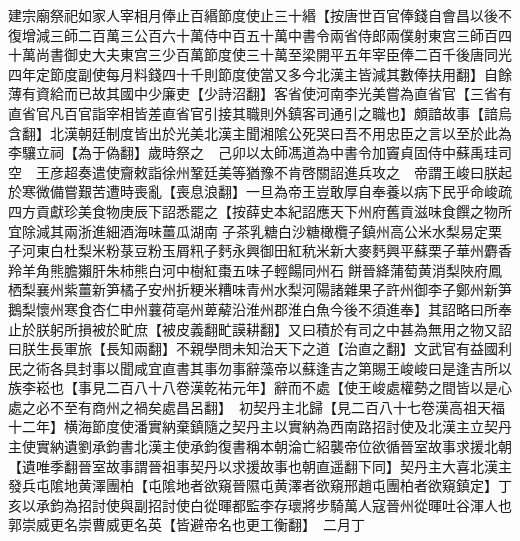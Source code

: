 建宗廟祭祀如家人宰相月俸止百緡節度使止三十緡【按唐世百官俸錢自會昌以後不復增減三師二百萬三公百六十萬侍中百五十萬中書令兩省侍郎兩僕射東宫三師百四十萬尚書御史大夫東宫三少百萬節度使三十萬至梁開平五年宰臣俸二百千後唐同光四年定節度副使每月料錢四十千則節度使當又多今北漢主皆減其數俸扶用翻】自餘薄有資給而已故其國中少廉吏【少詩沼翻】客省使河南李光美嘗為直省官【三省有直省官凡百官詣宰相皆差直省官引接其職則外鎮客司通引之職也】頗諳故事【諳烏含翻】北漢朝廷制度皆出於光美北漢主聞湘隂公死哭曰吾不用忠臣之言以至於此為李驤立祠【為于偽翻】歲時祭之　己卯以太師馮道為中書令加竇貞固侍中蘇禹珪司空　王彦超奏遣使齎敕詣徐州鞏廷美等猶豫不肯啓關詔進兵攻之　帝謂王峻曰朕起於寒微備嘗艱苦遭時喪亂【喪息浪翻】一旦為帝王豈敢厚自奉養以病下民乎命峻疏四方貢獻珍美食物庚辰下詔悉罷之【按薛史本紀詔應天下州府舊貢滋味食饌之物所宜除減其兩浙進細酒海味薑瓜湖南子茶乳糖白沙糖橄欖子鎮州高公米水梨易定栗子河東白杜梨米粉菉豆粉玉屑籸子麫永興御田紅秔米新大麥麫興平蘇栗子華州麝香羚羊角熊膽獺肝朱柿熊白河中樹紅棗五味子輕餳同州石餅晉絳蒲萄黄消梨陜府鳳栖梨襄州紫薑新笋橘子安州折粳米糟味青州水梨河陽諸雜果子許州御李子鄭州新笋鵝梨懷州寒食杏仁申州蘘荷亳州萆薢沿淮州郡淮白魚今後不須進奉】其詔略曰所奉止於朕躬所損被於甿庶【被皮義翻甿謨耕翻】又曰積於有司之中甚為無用之物又詔曰朕生長軍旅【長知兩翻】不親學問未知治天下之道【治直之翻】文武官有益國利民之術各具封事以聞咸宜直書其事勿事辭藻帝以蘇逢吉之第賜王峻峻曰是逢吉所以族李崧也【事見二百八十八卷漢乾祐元年】辭而不處【使王峻處權勢之間皆以是心處之必不至有商州之禍矣處昌呂翻】　初契丹主北歸【見二百八十七卷漢高祖天福十二年】横海節度使潘實納棄鎮隨之契丹主以實納為西南路招討使及北漢主立契丹主使實納遺劉承鈞書北漢主使承鈞復書稱本朝淪亡紹襲帝位欲循晉室故事求援北朝【遺唯季翻晉室故事謂晉祖事契丹以求援故事也朝直遥翻下同】契丹主大喜北漢主發兵屯隂地黄澤團柏【屯隂地者欲窺晉隰屯黄澤者欲窺邢趙屯團柏者欲窺鎮定】丁亥以承鈞為招討使與副招討使白從暉都監李存瓌將步騎萬人寇晉州從暉吐谷渾人也郭崇威更名崇曹威更名英【皆避帝名也更工衡翻】　二月丁


